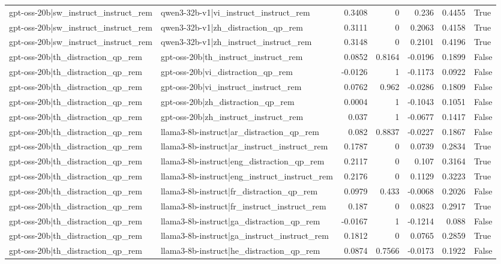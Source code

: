 \begin{table}
\begin{tabular}{l l r r r r l}
gpt-oss-20b|sw_instruct_instruct_rem & qwen3-32b-v1|vi_instruct_instruct_rem & 0.3408 & 0 & 0.236 & 0.4455 & True \\
gpt-oss-20b|sw_instruct_instruct_rem & qwen3-32b-v1|zh_distraction_qp_rem & 0.3111 & 0 & 0.2063 & 0.4158 & True \\
gpt-oss-20b|sw_instruct_instruct_rem & qwen3-32b-v1|zh_instruct_instruct_rem & 0.3148 & 0 & 0.2101 & 0.4196 & True \\
gpt-oss-20b|th_distraction_qp_rem & gpt-oss-20b|th_instruct_instruct_rem & 0.0852 & 0.8164 & -0.0196 & 0.1899 & False \\
gpt-oss-20b|th_distraction_qp_rem & gpt-oss-20b|vi_distraction_qp_rem & -0.0126 & 1 & -0.1173 & 0.0922 & False \\
gpt-oss-20b|th_distraction_qp_rem & gpt-oss-20b|vi_instruct_instruct_rem & 0.0762 & 0.962 & -0.0286 & 0.1809 & False \\
gpt-oss-20b|th_distraction_qp_rem & gpt-oss-20b|zh_distraction_qp_rem & 0.0004 & 1 & -0.1043 & 0.1051 & False \\
gpt-oss-20b|th_distraction_qp_rem & gpt-oss-20b|zh_instruct_instruct_rem & 0.037 & 1 & -0.0677 & 0.1417 & False \\
gpt-oss-20b|th_distraction_qp_rem & llama3-8b-instruct|ar_distraction_qp_rem & 0.082 & 0.8837 & -0.0227 & 0.1867 & False \\
gpt-oss-20b|th_distraction_qp_rem & llama3-8b-instruct|ar_instruct_instruct_rem & 0.1787 & 0 & 0.0739 & 0.2834 & True \\
gpt-oss-20b|th_distraction_qp_rem & llama3-8b-instruct|eng_distraction_qp_rem & 0.2117 & 0 & 0.107 & 0.3164 & True \\
gpt-oss-20b|th_distraction_qp_rem & llama3-8b-instruct|eng_instruct_instruct_rem & 0.2176 & 0 & 0.1129 & 0.3223 & True \\
gpt-oss-20b|th_distraction_qp_rem & llama3-8b-instruct|fr_distraction_qp_rem & 0.0979 & 0.433 & -0.0068 & 0.2026 & False \\
gpt-oss-20b|th_distraction_qp_rem & llama3-8b-instruct|fr_instruct_instruct_rem & 0.187 & 0 & 0.0823 & 0.2917 & True \\
gpt-oss-20b|th_distraction_qp_rem & llama3-8b-instruct|ga_distraction_qp_rem & -0.0167 & 1 & -0.1214 & 0.088 & False \\
gpt-oss-20b|th_distraction_qp_rem & llama3-8b-instruct|ga_instruct_instruct_rem & 0.1812 & 0 & 0.0765 & 0.2859 & True \\
gpt-oss-20b|th_distraction_qp_rem & llama3-8b-instruct|he_distraction_qp_rem & 0.0874 & 0.7566 & -0.0173 & 0.1922 & False \\

\end{tabular}
\end{table}
